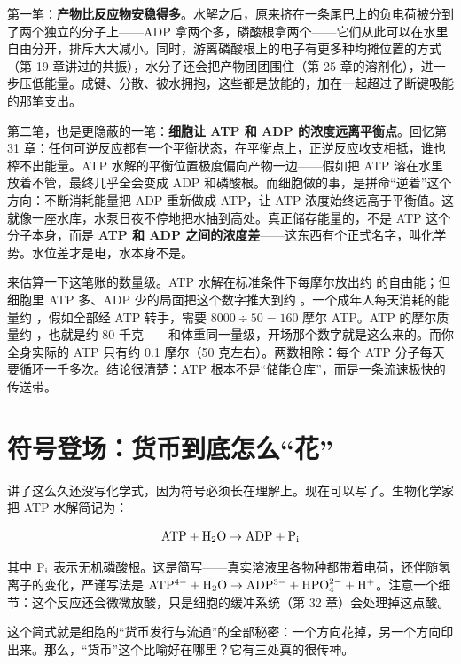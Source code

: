 第一笔：\textbf{产物比反应物安稳得多}。水解之后，原来挤在一条尾巴上的负电荷被分到了两个独立的分子上——ADP 拿两个多，磷酸根拿两个——它们从此可以在水里自由分开，排斥大大减小。同时，游离磷酸根上的电子有更多种均摊位置的方式（第 19 章讲过的共振），水分子还会把产物团团围住（第 25 章的溶剂化），进一步压低能量。成键、分散、被水拥抱，这些都是放能的，加在一起超过了断键吸能的那笔支出。

第二笔，也是更隐蔽的一笔：\textbf{细胞让 ATP 和 ADP 的浓度远离平衡点}。回忆第 31 章：任何可逆反应都有一个平衡状态，在平衡点上，正逆反应收支相抵，谁也榨不出能量。ATP 水解的平衡位置极度偏向产物一边——假如把 ATP 溶在水里放着不管，最终几乎全会变成 ADP 和磷酸根。而细胞做的事，是拼命“逆着”这个方向：不断消耗能量把 ADP 重新做成 ATP，让 ATP 浓度始终远高于平衡值。这就像一座水库，水泵日夜不停地把水抽到高处。真正储存能量的，不是 ATP 这个分子本身，而是 \textbf{ATP 和 ADP 之间的浓度差}——这东西有个正式名字，叫化学势。水位差才是电，水本身不是。

\begin{qiaoliang}
来估算一下这笔账的数量级。ATP 水解在标准条件下每摩尔放出约  的自由能；但细胞里 ATP 多、ADP 少的局面把这个数字推大到约 。一个成年人每天消耗的能量约 ，假如全部经 ATP 转手，需要 $8000 \div 50 = 160$ 摩尔 ATP。ATP 的摩尔质量约 ，也就是约 80 千克——和体重同一量级，开场那个数字就是这么来的。而你全身实际的 ATP 只有约 0.1 摩尔（50 克左右）。两数相除：每个 ATP 分子每天要循环一千多次。结论很清楚：ATP 根本不是“储能仓库”，而是一条流速极快的传送带。
\end{qiaoliang}

\section{符号登场：货币到底怎么“花”}

讲了这么久还没写化学式，因为符号必须长在理解上。现在可以写了。生物化学家把 ATP 水解简记为：

\[\mathrm{ATP} + \mathrm{H_2O} \rightarrow \mathrm{ADP} + \mathrm{P_i}\]

其中 $\mathrm{P_i}$ 表示无机磷酸根。这是简写——真实溶液里各物种都带着电荷，还伴随氢离子的变化，严谨写法是 $\mathrm{ATP^{4-}} + \mathrm{H_2O} \rightarrow \mathrm{ADP^{3-}} + \mathrm{HPO_4^{2-}} + \mathrm{H^+}$。注意一个细节：这个反应还会微微放酸，只是细胞的缓冲系统（第 32 章）会处理掉这点酸。

这个简式就是细胞的“货币发行与流通”的全部秘密：一个方向花掉，另一个方向印出来。那么，“货币”这个比喻好在哪里？它有三处真的很传神。

